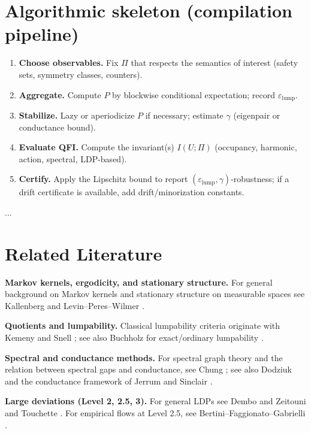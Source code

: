 \documentclass[11pt]{article}
\newcommand{\gap}{\gamma}             %
\newcommand{\1}{\mathbf{1}}
\begin{document}
\section{Algorithmic skeleton (compilation pipeline)}
\begin{enumerate}[leftmargin=1.6em,itemsep=0.25em]
\item \textbf{Choose observables.} Fix $\Pi$ that respects the semantics of interest (safety sets, symmetry classes, counters).
\item \textbf{Aggregate.} Compute $P$ by blockwise conditional expectation; record $\varepsilon_{\mathrm{lump}}$.
\item \textbf{Stabilize.} Lazy or aperiodicize $P$ if necessary; estimate $\gap$ (eigenpair or conductance bound\cite{Chung1997}).
\item \textbf{Evaluate QFI.} Compute the invariant(s) $I(U;\Pi)$ (occupancy, harmonic, action, spectral, LDP-based).
\item \textbf{Certify.} Apply the Lipschitz bound to report $(\varepsilon_{\mathrm{lump}},\gap)$-robustness; if a drift certificate is available, add drift/minorization constants\cite{MeynTweedie}.
\end{enumerate}

...

\section{Related Literature}
\vspace{-0.3em}
\noindent\textbf{Markov kernels, ergodicity, and stationary structure.}
For general background on Markov kernels and stationary structure on measurable spaces see Kallenberg \cite{Kallenberg2002} and Levin--Peres--Wilmer \cite{LevinPeresWilmer2017}. %
\smallskip

\noindent\textbf{Quotients and lumpability.}
Classical lumpability criteria originate with Kemeny and Snell \cite{KemenySnell1960}; see also Buchholz for exact/ordinary lumpability \cite{Buchholz1994}.
\smallskip

\noindent\textbf{Spectral and conductance methods.}
For spectral graph theory and the relation between spectral gaps and conductance, see Chung \cite{Chung1997}; see also Dodziuk \cite{Dodziuk1984} and the conductance framework of Jerrum and Sinclair \cite{JerrumSinclair1989}.
\smallskip

\noindent\textbf{Large deviations (Level 2, 2.5, 3).}
For general LDPs see Dembo and Zeitouni \cite{DemboZeitouni1998} and Touchette \cite{Touchette2009}.
For empirical flows at Level 2.5, see Bertini--Faggionato--Gabrielli \cite{BertiniFaggionatoGabrielli2015}.
\smallskip
\end{document}

